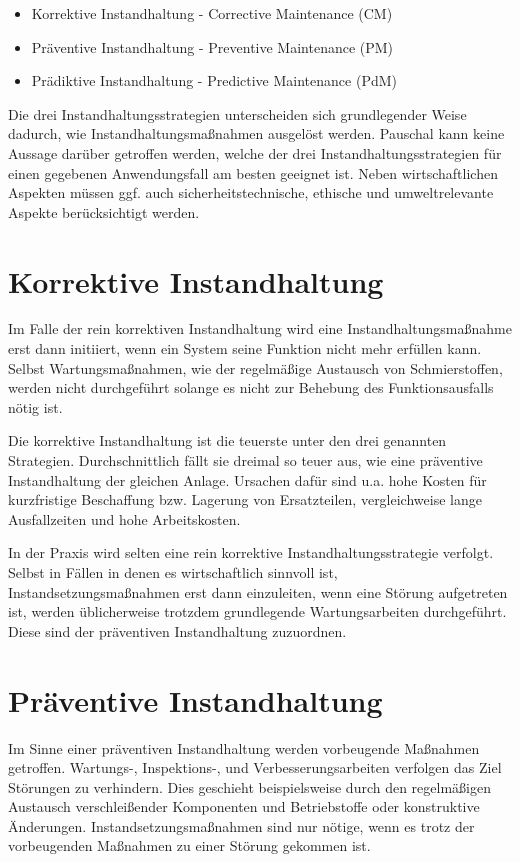 \begin{itemize}
    \item Korrektive Instandhaltung - Corrective Maintenance (CM)
    \item Präventive Instandhaltung - Preventive Maintenance (PM)
    \item Prädiktive Instandhaltung - Predictive Maintenance (PdM)
\end{itemize}

Die drei Instandhaltungsstrategien unterscheiden sich grundlegender Weise dadurch, wie Instandhaltungsmaßnahmen ausgelöst werden. Pauschal kann keine Aussage darüber getroffen werden, welche der drei Instandhaltungsstrategien für einen gegebenen Anwendungsfall am besten geeignet ist. Neben wirtschaftlichen Aspekten müssen ggf. auch sicherheitstechnische, ethische und umweltrelevante Aspekte berücksichtigt werden.
\section{Korrektive Instandhaltung}
\label{sec:korrektive_instandhaltung}
Im Falle der rein korrektiven Instandhaltung wird eine Instandhaltungsmaßnahme erst dann initiiert, wenn ein System seine Funktion nicht mehr erfüllen kann. Selbst Wartungsmaßnahmen, wie der regelmäßige Austausch von Schmierstoffen, werden nicht durchgeführt solange es nicht zur Behebung des Funktionsausfalls nötig ist.~\cite[S.~2]{Mobley.2002}

Die korrektive Instandhaltung ist die teuerste unter den drei genannten Strategien. Durchschnittlich fällt sie dreimal so teuer aus, wie eine präventive Instandhaltung der gleichen Anlage. Ursachen dafür sind u.a. hohe Kosten für kurzfristige Beschaffung bzw. Lagerung von Ersatzteilen, vergleichweise lange Ausfallzeiten und hohe Arbeitskosten.~\cite[S.~3]{Mobley.2002}

In der Praxis wird selten eine rein korrektive Instandhaltungsstrategie verfolgt. Selbst in Fällen in denen es wirtschaftlich sinnvoll ist, Instandsetzungsmaßnahmen erst dann einzuleiten, wenn eine Störung aufgetreten ist, werden üblicherweise trotzdem grundlegende Wartungsarbeiten durchgeführt. Diese sind der präventiven Instandhaltung zuzuordnen.~\cite[S.~2]{Mobley.2002}
\section{Präventive Instandhaltung}
\label{sec:praeventive_instandhaltung}
Im Sinne einer präventiven Instandhaltung werden vorbeugende Maßnahmen getroffen. Wartungs-, Inspektions-, und Verbesserungsarbeiten verfolgen das Ziel Störungen zu verhindern. Dies geschieht beispielsweise durch den regelmäßigen Austausch verschleißender Komponenten und Betriebstoffe oder konstruktive Änderungen. Instandsetzungsmaßnahmen sind nur nötige, wenn es trotz der vorbeugenden Maßnahmen zu einer Störung gekommen ist.

